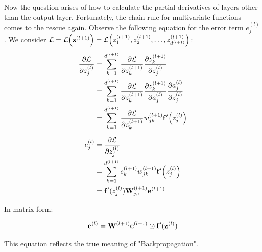 \documentclass[14pt, a4paper]{article}
\numberwithin{equation}{section}
\numberwithin{algorithm}{section}
\numberwithin{figure}{section}
\begin{document}
Now the question arises of how to calculate the partial derivatives of layers other than the output layer. Fortunately, the chain rule for multivariate functions comes to the rescue again. Observe the following equation for the error term $e_j^{(l)}$.
We consider $\mathcal{L} = \mathcal{L}\Big(\bold{z}^{(l+1)}\Big)=\mathcal{L}\Big(z_1^{(l+1)}, z_2^{(l+1)}, \dots, z_{d^{(l+1)}}^{(l+1)}\Big)$:
\begin{equation}
	\begin{aligned}
		\dfrac{\partial \mathcal{L}}{\partial z_j^{(l)}}&=\sum_{k=1}^{d^{(l+1)}}\dfrac{\partial \mathcal{L}}{\partial z_k^{(l+1)}} \dfrac{\partial z_k^{(l+1)}}{\partial z_j^{(l)}}\\&=\sum_{k=1}^{d^{(l+1)}} \dfrac{\partial \mathcal{L}}{\partial z_k^{(l+1)}} \dfrac{\partial z_k^{(l+1)}}{\partial a_j^{(l)}} \dfrac{\partial a_j^{(l)}}{\partial z_j^{(l)}}\\&=\sum_{k=1}^{d^{(l+1)}}\dfrac{\partial \mathcal{L}}{\partial z_k^{(l+1)}}w_{jk}^{(l+1)}\bold{f}^{\prime}\Big(z_j^{(l)}\Big)
	\end{aligned}
\end{equation}

\begin{equation}
	\begin{aligned}
		e_j^{(l)}&=\dfrac{\partial \mathcal{L}}{\partial z_j^{(l)}}\\&=\sum_{k=1}^{d^{(l+1)}}e_k^{(l+1)}w_{jk}^{(l+1)}\bold{f}^{\prime}\Big(z_j^{(l)}\Big)\\&=\bold{f}^{\prime}(z_j^{(l)})\bold{W}_{j,:}^{(l+1)}\bold{e}^{(l+1)}
	\end{aligned}
\end{equation}

In matrix form:

\begin{equation}
  \bold{e}^{(l)}=\bold{W}^{(l+1)}\bold{e}^{(l+1)}\odot\bold{f}^{\prime}(\bold{z}^{(l)})
\end{equation}

This equation reflects the true meaning of "Backpropagation".
\end{document}
